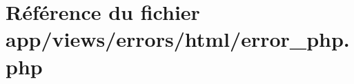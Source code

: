 \hypertarget{html_2error__php_8php}{}\section{Référence du fichier app/views/errors/html/error\+\_\+php.php}
\label{html_2error__php_8php}
